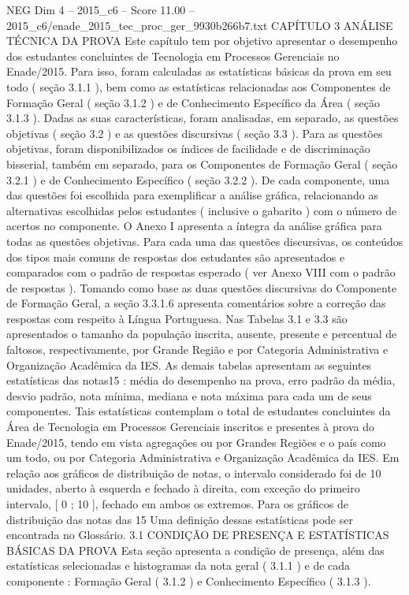 \begin{textsample}{NEG Dim 4 – 2015\_c6 – Score 11.00 – 2015\_c6/enade\_2015\_tec\_proc\_ger\_9930b266b7.txt}  \label{ex:f4_neg_335}
CAPÍTULO 3 ANÁLISE TÉCNICA DA PROVA Este capítulo tem por objetivo apresentar o desempenho dos estudantes concluintes de Tecnologia em Processos Gerenciais no Enade/2015.
Para isso, foram calculadas as estatísticas básicas da prova em seu todo ( seção 3.1.1 ), bem como as estatísticas relacionadas aos Componentes de Formação Geral ( seção 3.1.2 ) e de Conhecimento Específico da Área ( seção 3.1.3 ).
Dadas as suas características, foram analisadas, em separado, as questões objetivas ( seção 3.2 ) e as questões discursivas ( seção 3.3 ).
Para as questões objetivas, foram disponibilizados os índices de facilidade e de discriminação bisserial, também em separado, para os Componentes de Formação Geral ( seção 3.2.1 ) e de Conhecimento Específico ( seção 3.2.2 ).
De cada componente, uma das questões foi escolhida para exemplificar a análise gráfica, relacionando as alternativas escolhidas pelos estudantes ( inclusive o gabarito ) com o número de acertos no componente.
O Anexo I apresenta a íntegra da análise gráfica para todas as questões objetivas.
Para cada uma das questões discursivas, os conteúdos dos tipos mais comuns de respostas dos estudantes são apresentados e comparados com o padrão de respostas esperado ( ver Anexo VIII com o padrão de respostas ).
Tomando como base as duas questões discursivas do Componente de Formação Geral, a seção 3.3.1.6 apresenta comentários sobre a correção das respostas com respeito à Língua Portuguesa.
Nas Tabelas 3.1 e 3.3 são apresentados o tamanho da população inscrita, ausente, presente e percentual de faltosos, respectivamente, por Grande Região e por Categoria Administrativa e Organização Acadêmica da IES.
As demais tabelas apresentam as seguintes estatísticas das notas15 : média do desempenho na prova, erro padrão da média, desvio padrão, nota mínima, mediana e nota máxima para cada um de seus componentes.
Tais estatísticas contemplam o total de estudantes concluintes da Área de Tecnologia em Processos Gerenciais inscritos e presentes à prova do Enade/2015, tendo em vista agregações ou por Grandes Regiões e o país como um todo, ou por Categoria Administrativa e Organização Acadêmica da IES.
Em relação aos gráficos de distribuição de notas, o intervalo considerado foi de 10 unidades, aberto à esquerda e fechado à direita, com exceção do primeiro intervalo, [ 0 ; 10 ], fechado em ambos os extremos.
Para os gráficos de distribuição das notas das 15 Uma definição dessas estatísticas pode ser encontrada no Glossário. 3.1 CONDIÇÃO DE PRESENÇA E ESTATÍSTICAS BÁSICAS DA PROVA Esta seção apresenta a condição de presença, além das estatísticas selecionadas e histogramas da nota geral ( 3.1.1 ) e de cada componente : Formação Geral ( 3.1.2 ) e Conhecimento Específico ( 3.1.3 ).

\end{textsample}
